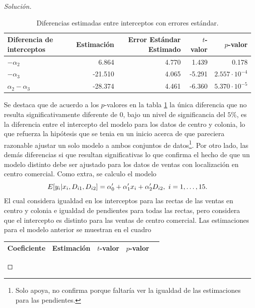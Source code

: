 \documentclass[10.5pt,notitlepage]{article}
\newenvironment{solucion}
  {\begin{proof}[Solución]}
  {\end{proof}}
\theoremstyle{plain}
\begin{document}
\begin{solucion}
\begin{table}[H]
{        \begin{tabular}{@{}l@{\hskip 0.3in}r@{\hskip 0.3in}r@{\hskip 0.3in}r@{\hskip 0.3in}r@{}}
            \toprule
            Diferencia de interceptos& Estimación & Error Estándar Estimado&\(t\)-valor& \(p\)-valor \\
            \midrule
            \(-\alpha_2\) & 6.864 & 4.770 &1.439 & 0.178 \\ 
            \(-\alpha_3\) &-21.510 & 4.065 & -5.291& \(2.557\cdot 10^{-4}\)\\ 
            \(\alpha_2-\alpha_3\) &-28.374&4.461&-6.360 & \(5.370\cdot10^{-5}\)\\ 
            \bottomrule
        \end{tabular}
        }
        \caption{Diferencias estimadas entre interceptos con errores estándar.}
        \label{tab:dif1}
\end{table}
Se destaca que de acuerdo a los \(p\)-valores en la tabla \ref{tab:dif1} la única diferencia que no resulta significativamente diferente de \(0\), bajo un nivel de significancia del \(5\%\), es la diferencia entre el intercepto del modelo para los datos de centro y colonia, lo que refuerza la hipótesis que se tenia en un inicio acerca de que pareciera razonable ajustar un solo modelo a ambos conjuntos de datos\footnote{Solo apoya, no confirma porque faltaría ver la igualdad de las estimaciones para las pendientes.}. Por otro lado, las demás diferencias si que resultan significativas lo que confirma el hecho de que un modelo distinto debe ser ajustado para los datos de ventas con localización en centro comercial. Como extra, se calculo el modelo 
\begin{equation}\label{dif222}
         E[y_i | x_i, D_{i1}, D_{i2}] = \alpha_{0}' + \alpha_{1}'x_{i} + \alpha_{2}'D_{i2}, \ i = 1, \hdots, 15.\\ 
\end{equation}
El cual considera igualdad en los interceptos para las rectas de las ventas en centro y colonia e igualdad de pendientes para todas las rectas, pero considera que el intercepto es distinto para las ventas de centro comercial. Las estimaciones para el modelo anterior se muestran en el cuadro
\begin{table}[H]
        \centering
        \begin{tabular}{@{}l@{\hskip 0.3in}r@{\hskip 0.3in}r@{\hskip 0.3in}r@{\hskip 0.3in}r@{}}
            \toprule
            Coeficiente& Estimación &\(t\)-valor& \(p\)-valor \\
            \midrule

\end{tabular}
\end{table}
\end{solucion}
\end{document}
